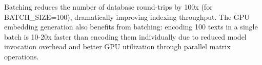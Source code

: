 Batching reduces the number of database round-trips by 100x (for BATCH\_SIZE=100), dramatically improving indexing throughput. The GPU embedding generation also benefits from batching: encoding 100 texts in a single batch is 10-20x faster than encoding them individually due to reduced model invocation overhead and better GPU utilization through parallel matrix operations.

\clearpage

